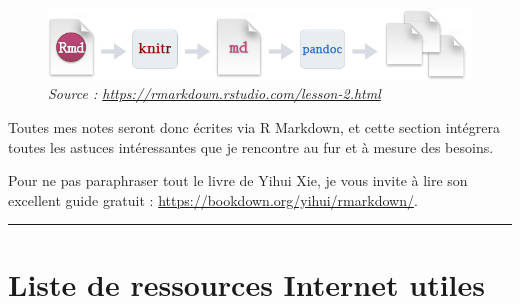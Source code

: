 \documentclass[
]{book}
\begin{document}
\begin{figure}

{\centering \includegraphics[width=9.85in]{images/rmarkdownflow} 

}

\caption{\emph{Source : \url{https://rmarkdown.rstudio.com/lesson-2.html}}}\label{fig:rmarkdownflow}
\end{figure}

Toutes mes notes seront donc écrites via R Markdown, et cette section intégrera
toutes les astuces intéressantes que je rencontre au fur et à mesure des
besoins.

Pour ne pas paraphraser tout le livre de Yihui Xie, je vous invite à
lire son excellent guide gratuit : \url{https://bookdown.org/yihui/rmarkdown/}.

\begin{center}\rule{0.5\linewidth}{0.5pt}\end{center}

\hypertarget{ref-rmd}{%
\section*{Liste de ressources Internet utiles}\label{ref-rmd}}
\end{document}
